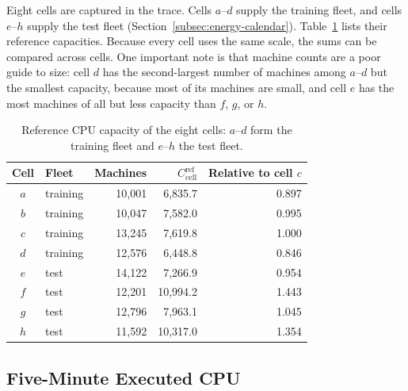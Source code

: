 \documentclass{UNCC-thesis}
\begin{document}
Eight cells are captured in the trace. Cells \(a\)--\(d\) supply the training fleet, and
cells \(e\)--\(h\) supply the test fleet (Section~\ref{subsec:energy-calendar}).
Table~\ref{tab:cell-capacity} lists their reference capacities. Because every
cell uses the same scale, the sums can be compared across cells. One important note is that machine counts are a poor
guide to size: cell \(d\) has the second-largest number of machines among
\(a\)--\(d\) but the smallest capacity, because most of its machines are
small, and cell \(e\) has the most machines of all but less capacity than
\(f\), \(g\), or \(h\). 

\begin{table}[htbp]
  \centering
  \footnotesize
  \caption{Reference CPU capacity of the eight cells: \(a\)--\(d\) form the
  training fleet and \(e\)--\(h\) the test fleet.}
  \label{tab:cell-capacity}
  \begin{tabular}{@{}clrrr@{}}
    \toprule
    Cell & Fleet & Machines & \(C^{\mathrm{ref}}_{\mathrm{cell}}\) & Relative to cell \(c\) \\
    \midrule
    \(a\) & training & 10,001 & 6,835.7 & 0.897 \\
    \(b\) & training & 10,047 & 7,582.0 & 0.995 \\
    \(c\) & training & 13,245 & 7,619.8 & 1.000 \\
    \(d\) & training & 12,576 & 6,448.8 & 0.846 \\
    \addlinespace
    \(e\) & test & 14,122 & 7,266.9 & 0.954 \\
    \(f\) & test & 12,201 & 10,994.2 & 1.443 \\
    \(g\) & test & 12,796 & 7,963.1 & 1.045 \\
    \(h\) & test & 11,592 & 10,317.0 & 1.354 \\
    \bottomrule
  \end{tabular}
\end{table}

\subsection{Five-Minute Executed CPU}
\label{subsec:clusterdata-utilization}
\end{document}

